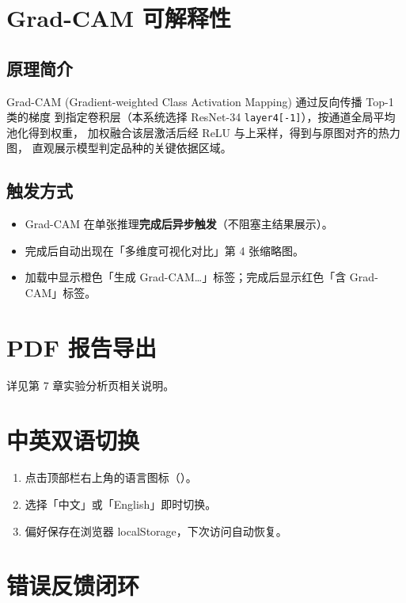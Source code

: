 \documentclass[12pt, a4paper, openany]{ctexbook}
\begin{document}
\section{Grad-CAM 可解释性}

\subsection{原理简介}

Grad-CAM (Gradient-weighted Class Activation Mapping) 通过反向传播 Top-1 类的梯度
到指定卷积层（本系统选择 ResNet-34 \texttt{layer4[-1]}），按通道全局平均池化得到权重，
加权融合该层激活后经 ReLU 与上采样，得到与原图对齐的热力图，
直观展示模型判定品种的关键依据区域。

\subsection{触发方式}

\begin{itemize}
  \item Grad-CAM 在单张推理\textbf{完成后异步触发}（不阻塞主结果展示）。
  \item 完成后自动出现在「多维度可视化对比」第 4 张缩略图。
  \item 加载中显示橙色「生成 Grad-CAM…」标签；完成后显示红色「含 Grad-CAM」标签。
\end{itemize}

\section{PDF 报告导出}

详见第 7 章实验分析页相关说明。

\section{中英双语切换}

\begin{enumerate}
  \item 点击顶部栏右上角的语言图标（）。
  \item 选择「中文」或「English」即时切换。
  \item 偏好保存在浏览器 localStorage，下次访问自动恢复。
\end{enumerate}

\section{错误反馈闭环}
\end{document}
